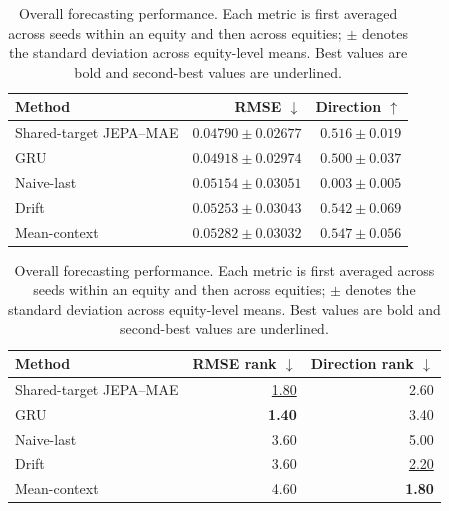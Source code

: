 \begin{table}[t]
\centering
\small
\caption{Overall forecasting performance. Each metric is first averaged across seeds within an equity and then across equities; $\pm$ denotes the standard deviation across equity-level means. Best values are bold and second-best values are underlined.}
\label{tab:main_metrics}
\begin{tabular}{lrr}
\toprule
Method & RMSE $\downarrow$ & Direction $\uparrow$ \\
\midrule
Shared-target JEPA--MAE & \textbf{$0.04790 \pm 0.02677$} & $0.516 \pm 0.019$ \\
GRU & \underline{$0.04918 \pm 0.02974$} & $0.500 \pm 0.037$ \\
Naive-last & $0.05154 \pm 0.03051$ & $0.003 \pm 0.005$ \\
Drift & $0.05253 \pm 0.03043$ & \underline{$0.542 \pm 0.069$} \\
Mean-context & $0.05282 \pm 0.03032$ & \textbf{$0.547 \pm 0.056$} \\
\bottomrule
\end{tabular}
\par\medskip
\begin{tabular}{lrr}
\toprule
Method & RMSE rank $\downarrow$ & Direction rank $\downarrow$ \\
\midrule
Shared-target JEPA--MAE & \underline{1.80} & 2.60 \\
GRU & \textbf{1.40} & 3.40 \\
Naive-last & 3.60 & 5.00 \\
Drift & 3.60 & \underline{2.20} \\
Mean-context & 4.60 & \textbf{1.80} \\
\bottomrule
\end{tabular}
\end{table}

